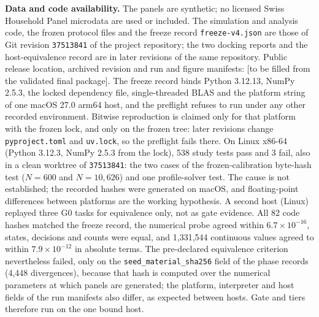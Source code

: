 \noindent\textbf{Data and code availability.}
The panels are synthetic; no licensed Swiss Household Panel microdata are used or included. %
The simulation and analysis code, the frozen protocol files and the freeze record \texttt{freeze-v4.json} are those of Git revision \texttt{37513841} of the project repository; the two docking reports and the host-equivalence record are in later revisions of the same repository. %
Public release location, archived revision and run and figure manifests: [to be filled from the validated final package]. %
The freeze record binds Python 3.12.13, NumPy 2.5.3, the locked dependency file, single-threaded BLAS and the platform string of one macOS 27.0 arm64 host, and the preflight refuses to run under any other recorded environment. %
Bitwise reproduction is claimed only for that platform with the frozen lock, and only on the frozen tree: later revisions change \texttt{pyproject.toml} and \texttt{uv.lock}, so the preflight fails there. %
On Linux x86-64 (Python 3.12.3, NumPy 2.5.3 from the lock), 538 study tests pass and 3 fail, also in a clean worktree of \texttt{37513841}: the two cases of the frozen-calibration byte-hash test ($N=600$ and $N=10{,}626$) and one profile-solver test. %
The cause is not established; the recorded hashes were generated on macOS, and floating-point differences between platforms are the working hypothesis. %
A second host (Linux) replayed three G0 tasks for equivalence only, not as gate evidence. %
All 82 code hashes matched the freeze record, the numerical probe agreed within $6.7\times10^{-16}$, states, decisions and counts were equal, and 1,331,544 continuous values agreed to within $7.9\times10^{-12}$ in absolute terms. %
The pre-declared equivalence criterion nevertheless failed, only on the \texttt{seed\_material\_sha256} field of the phase records (4,448 divergences), because that hash is computed over the numerical parameters at which panels are generated; the platform, interpreter and host fields of the run manifests also differ, as expected between hosts. %
Gate and tiers therefore run on the one bound host. %
